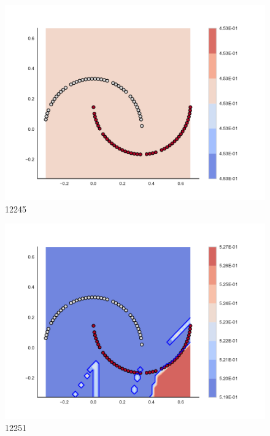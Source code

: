 \begin{subfigure}[b]{0.09\textwidth}
    \includegraphics[clip, trim=2.35cm 1.75cm 4.5cm 0cm,width=\textwidth]{img/convergence/12245.pdf}
    \caption{12245}
    \label{fig:convergence_12245}
\end{subfigure}
%
\begin{subfigure}[b]{0.09\textwidth}
    \includegraphics[clip, trim=2.35cm 1.75cm 4.5cm 0cm,width=\textwidth]{img/convergence/12251.pdf}
    \caption{12251}
    \label{fig:convergence_12251}
\end{subfigure}
%
